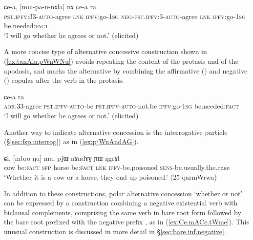 \begin{exe}
\ex  \label{ex:pannAla.nA}
\gll  [pa-n-nɤla] ɕe-a, [mɯ-pa-n-nɤla] nɤ ɕe-a ra    \\
 \textsc{pst}.\textsc{ipfv}:3\fl{}3-\textsc{auto}-agree \textsc{lnk} \textsc{ipfv}:go-\textsc{1sg}
  \textsc{neg}-\textsc{pst}.\textsc{ipfv}:3\fl{}-\textsc{auto}-agree \textsc{lnk} \textsc{ipfv}:go-\textsc{1sg} be.needed:\textsc{fact} \\
\glt `I will go whether he agrees or not.' (elicited)
\end{exe}

A more concise type of alternative concessive construction shown in (\ref{ex:tanAla.pWnWNu}) avoids repeating the content of the protasis and of the apodosis, and marks the alternative by combining the affirmative () and negative () copulas after the verb in the protasis.

\begin{exe}
\ex  \label{ex:tanAla.pWnWNu}
 ɕe-a ra \\
\textsc{aor}:3\fl{}3-agree \textsc{pst}.\textsc{ipfv}-\textsc{auto}-be \textsc{pst}.\textsc{ipfv}-\textsc{auto}-not.be \textsc{ipfv}:go-\textsc{1sg} be.needed:\textsc{fact} \\
\glt `I will go whether he agrees or not.' (elicited)
\end{exe}
 
Another way to indicate alternative concession is the interrogative particle  (§\ref{sec:fsp.interrog}) as in (\ref{ex:pjWnAndAG}).

\begin{exe}
\ex  \label{ex:pjWnAndAG}
\gll [nɯŋa ŋu] ɕi, [mbro ŋu] ma, pjɯ-nɤndɤɣ ɲɯ-ŋgrɤl  \\
cow be:\textsc{fact} \textsc{sfp} horse  be:\textsc{fact} \textsc{lnk} \textsc{ipfv}-be.poisoned \textsc{sens}-be.usually.the.case \\
\glt `Whether it is a cow or a horse, they end up poisoned.' (25-qarmWrwa)
\end{exe}

In addition to these constructions, polar alternative concession `whether or not' can be expressed by a construction combining a negative existential verb with biclausal complements, comprising the same verb in bare root form followed by the bare root prefixed with the negative prefix , as in (\ref{ex:Ce.mACe.tWme}). This unusual construction is discussed in more detail in §\ref{sec:bare.inf.negative}.

